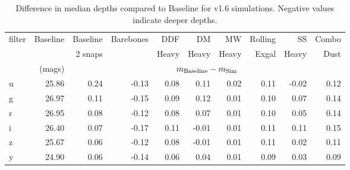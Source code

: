 \begin{table}
\begin{centering}
\begin{tabular}{lrrrrrrrrr}
\toprule
filter &  Baseline &  Baseline &  Barebones &  DDF  &  DM  &  MW  &  Rolling  &  SS  &  Combo  \\
 & & 2 snaps & & Heavy & Heavy & Heavy & Exgal & Heavy & Dust \\
 & (mags) &  \multicolumn{8}{c}{$m_{\rm{Baseline}} - m_{\rm{Sim}}$} \\ 
\hline
     u &     25.86 &              0.24 &      -0.13 &       0.08 &      0.11 &      0.02 &           0.11 &     -0.02 &        0.12 \\
     g &     26.97 &              0.11 &      -0.15 &       0.09 &      0.12 &      0.01 &           0.10 &      0.07 &        0.14 \\
     r &     26.95 &              0.08 &      -0.12 &       0.08 &      0.07 &      0.01 &           0.10 &      0.05 &        0.14 \\
     i &     26.40 &              0.07 &      -0.17 &       0.11 &     -0.01 &      0.01 &           0.11 &      0.11 &        0.15 \\
     z &     25.67 &              0.06 &      -0.12 &       0.08 &     -0.01 &      0.01 &           0.11 &      0.02 &        0.11 \\
     y &     24.90 &              0.06 &      -0.14 &       0.06 &      0.04 &      0.01 &           0.09 &      0.03 &        0.09 \\
\end{tabular}
\caption{Difference in median depths compared to Baseline for v1.6 simulations. Negative values indicate deeper depths.}\label{table:depths}
\end{centering}
\end{table}

